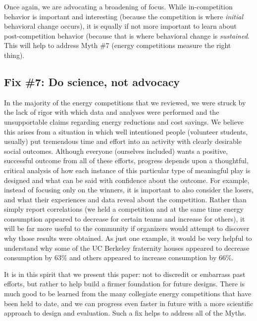 \documentclass[jou]{apa} %
\begin{document}
Once again, we are advocating a broadening of focus.   While in-competition behavior is
important and interesting (because the competition is where {\em initial} behavioral change
occurs), it is equally if not more important to learn about post-competition behavior
(because that is where behavioral change is {\em sustained}.  This will help to address
Myth \#7 (energy competitions measure the right thing).

\subsection{Fix \#7: Do science, not advocacy}

In the majority of the energy competitions that we reviewed, we were struck by the lack of
rigor with which data and analyses were performed and the unsupportable claims regarding
energy reductions and cost savings.  We believe this arises from a situation in which well
intentioned people (volunteer students, usually) put tremendous time and effort into an
activity with clearly desirable social outcomes.  Although everyone (ourselves included)
wants a positive, successful outcome from all of these efforts, progress depends upon a
thoughtful, critical analysis of how each instance of this particular type of meaningful
play is designed and what can be said with confidence about the outcome.  For example,
instead of focusing only on the winners, it is important to also consider the losers, and
what their experiences and data reveal about the competition.  Rather than simply report
correlations (we held a competition and at the same time energy consumption appeared to
decrease for certain teams and increase for others), it will be far more useful to the
community if organizers would attempt to discover why those results were obtained.  As
just one example, it would be very helpful to understand why some of the UC Berkeley
fraternity houses appeared to decrease consumption by 63\% and others appeared to increase
consumption by 66\%. 

It is in this spirit that we present this paper: not to discredit or embarrass past
efforts, but rather to help build a firmer foundation for future designs.  There is much
good to be learned from the many collegiate energy competitions that have been held to
date, and we can progress even faster in future with a more scientific approach to 
design and evaluation.  Such a fix helps to address all of the Myths.


\end{document}
